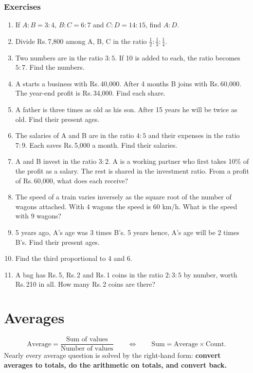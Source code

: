 \documentclass[11pt,a4paper,openany]{report}
\newenvironment{exercises}{\subsection*{Exercises \thechapter}\begin{enumerate}[label=\textbf{\thechapter.\arabic*},leftmargin=3.2em]}{\end{enumerate}}
\newcommand{\Rs}{Rs.\,}
\begin{document}
\begin{exercises}
\item If $A:B=3:4$, $B:C=6:7$ and $C:D=14:15$, find $A:D$.
\item Divide \Rs7,800 among A, B, C in the ratio $\frac12:\frac13:\frac14$.
\item Two numbers are in the ratio $3:5$. If 10 is added to each, the ratio becomes $5:7$. Find the numbers.
\item A starts a business with \Rs40,000. After 4 months B joins with \Rs60,000. The year-end profit is \Rs34,000. Find each share.
\item A father is three times as old as his son. After 15 years he will be twice as old. Find their present ages.
\item The salaries of A and B are in the ratio $4:5$ and their expenses in the ratio $7:9$. Each saves \Rs5,000 a month. Find their salaries.
\item A and B invest in the ratio $3:2$. A is a working partner who first takes 10\% of the profit as a salary. The rest is shared in the investment ratio. From a profit of \Rs60,000, what does each receive?
\item The speed of a train varies inversely as the square root of the number of wagons attached. With 4 wagons the speed is 60 km/h. What is the speed with 9 wagons?
\item 5 years ago, A's age was 3 times B's. 5 years hence, A's age will be 2 times B's. Find their present ages.
\item Find the third proportional to 4 and 6.
\item A bag has \Rs5, \Rs2 and \Rs1 coins in the ratio $2:3:5$ by number, worth \Rs210 in all. How many \Rs2 coins are there?
\end{exercises}

\chapter{Averages}\label{ch:avg}

\[\text{Average}=\frac{\text{Sum of values}}{\text{Number of values}}\qquad\Longleftrightarrow\qquad\text{Sum}=\text{Average}\times\text{Count}.\]
Nearly every average question is solved by the right-hand form: \textbf{convert averages to totals, do the arithmetic on totals, and convert back.}
\end{document}
